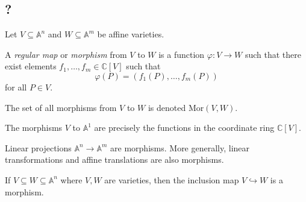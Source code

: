 \subsection{?}
Let \( V \subseteq \mathbb A^n \) and \( W \subseteq \mathbb A^m \) be affine varieties.
\begin{definition}
    A \emph{regular map} or \emph{morphism} from \( V \) to \( W \) is a function \( \varphi \colon V \to W \) such that there exist elements \( f_1, \dots, f_m \in \mathbb C[V] \) such that
    \[ \varphi(P) = (f_1(P), \dots, f_m(P)) \]
    for all \( P \in V \).
\end{definition}
The set of all morphisms from \( V \) to \( W \) is denoted \( \mathrm{Mor}(V,W) \).
\begin{example}
    The morphisms \( V \) to \( \mathbb A^1 \) are precisely the functions in the coordinate ring \( \mathbb C[V] \).
\end{example}
\begin{example}
    Linear projections \( \mathbb A^n \to \mathbb A^m \) are morphisms.
    More generally, linear transformations and affine translations are also morphisms.
\end{example}
\begin{example}
    If \( V \subseteq W \subseteq \mathbb A^n \) where \( V, W \) are varieties, then the inclusion map \( V \hookrightarrow W \) is a morphism.
\end{example}
